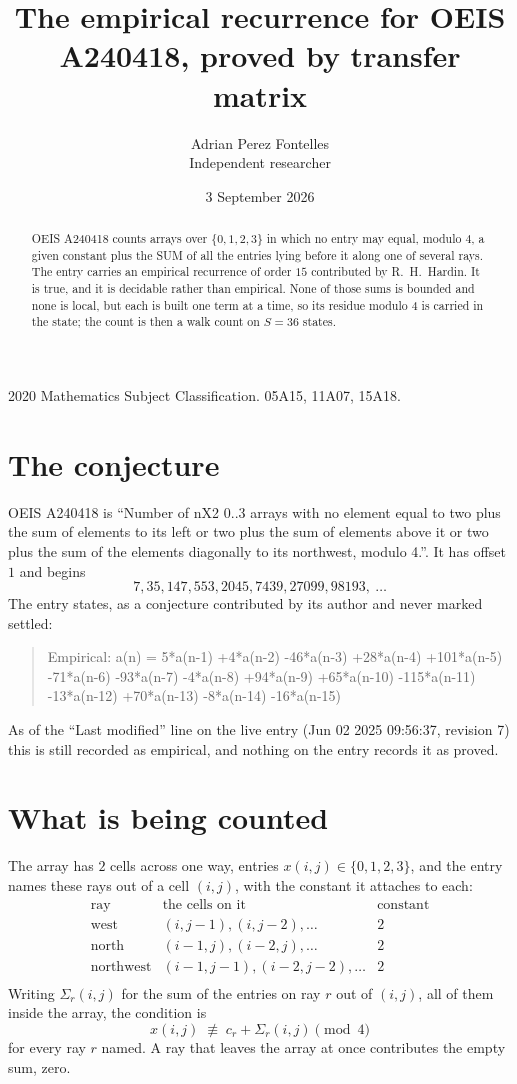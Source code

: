 \documentclass[11pt,a4paper]{article}
\title{The empirical recurrence for OEIS A240418, proved by transfer matrix}
\author{Adrian Perez Fontelles\\ \small Independent researcher}
\date{3 September 2026}
\theoremstyle{plain}
\theoremstyle{definition}
\begin{document}
\maketitle

\begin{abstract}
OEIS A240418 counts arrays over $\{0,1,2,3\}$ in which no entry may equal, modulo $4$, a given
constant plus the SUM of all the entries lying before it along one of several rays. The entry
carries an empirical recurrence of order $15$ contributed by R.~H.~Hardin. It is true, and
it is decidable rather than empirical. None of those sums is bounded and none is local, but
each is built one term at a time, so its residue modulo $4$ is carried in the state; the
count is then a walk count on $S=36$ states.
\end{abstract}

\noindent\small 2020 Mathematics Subject Classification. 05A15, 11A07, 15A18.\normalsize

\section{The conjecture}

OEIS A240418 is ``Number of nX2 0..3 arrays with no element equal to two plus the sum of elements to its left or two plus the sum of elements above it or two plus the sum of the elements diagonally to its northwest, modulo 4.''. It has offset $1$ and begins
\[
7, 35, 147, 553, 2045, 7439, 27099, 98193,\ \dots
\]
The entry states, as a conjecture contributed by its author and never marked settled:
\begin{quote}
Empirical: a(n) = 5*a(n-1) +4*a(n-2) -46*a(n-3) +28*a(n-4) +101*a(n-5) -71*a(n-6) -93*a(n-7) -4*a(n-8) +94*a(n-9) +65*a(n-10) -115*a(n-11) -13*a(n-12) +70*a(n-13) -8*a(n-14) -16*a(n-15)
\end{quote}
As of the ``Last modified'' line on the live entry (Jun 02 2025 09:56:37, revision 7) this is still
recorded as empirical, and nothing on the entry records it as proved.

\section{What is being counted}

The array has $2$ cells across one way, entries $x(i,j)\in\{0,1,2,3\}$, and the entry names these
rays out of a cell $(i,j)$, with the constant it attaches to each:
\[
\begin{array}{lll}
\text{ray} & \text{the cells on it} & \text{constant} \\[2pt]
\text{west} & (i,j-1),(i,j-2),\dots & 2 \\
\text{north} & (i-1,j),(i-2,j),\dots & 2 \\
\text{northwest} & (i-1,j-1),(i-2,j-2),\dots & 2 \\
\end{array}
\]
Writing $\Sigma_r(i,j)$ for the sum of the entries on ray $r$ out of $(i,j)$, all of them
inside the array, the condition is
\[
x(i,j)\;\not\equiv\;c_r+\Sigma_r(i,j) \pmod{4}
\]
for every ray $r$ named. A ray that leaves the array at once contributes the empty sum,
zero.
\end{document}
